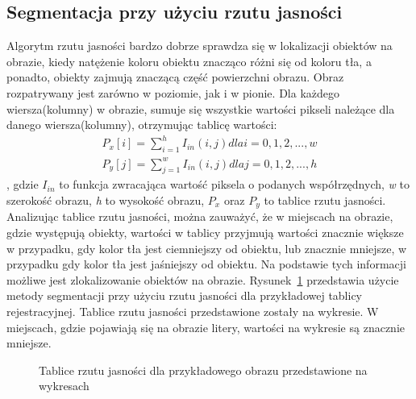 \subsection{Segmentacja przy użyciu rzutu jasności}
Algorytm rzutu jasności bardzo dobrze sprawdza się w lokalizacji obiektów na obrazie, kiedy natężenie koloru obiektu znacząco różni się od koloru tła, a ponadto, obiekty zajmują znaczącą część powierzchni obrazu. Obraz rozpatrywany jest zarówno w poziomie, jak i w pionie. Dla każdego wiersza(kolumny) w obrazie, sumuje się wszystkie wartości pikseli należące dla danego wiersza(kolumny), otrzymując tablicę wartości:
\begin{gather*}
  P_x[i] = \sum\limits_{i=1}^h I_{in}(i, j) dla i = 0,1,2,...,w \\
  P_y[j] = \sum\limits_{j=1}^w I_{in}(i, j) dla j = 0,1,2,...,h
\end{gather*}, gdzie $I_{in}$ to funkcja zwracająca wartość piksela o podanych współrzędnych, \textit{w} to szerokość obrazu, \textit{h} to wysokość obrazu, $P_x$ oraz $P_y$ to tablice rzutu jasności. Analizując tablice rzutu jasności, można zauważyć, że w miejscach na obrazie, gdzie występują obiekty, wartości w tablicy przyjmują wartości znacznie większe w przypadku, gdy kolor tła jest ciemniejszy od obiektu, lub znacznie mniejsze, w przypadku gdy kolor tła jest jaśniejszy od obiektu. Na podstawie tych informacji możliwe jest zlokalizowanie obiektów na obrazie. Rysunek~\ref{fig:rzut_jasnosci} przedstawia użycie metody segmentacji przy użyciu rzutu jasności dla przykładowej tablicy rejestracyjnej. Tablice rzutu jasności przedstawione zostały na wykresie. W miejscach, gdzie pojawiają się na obrazie litery, wartości na wykresie są znacznie mniejsze.

\begin{figure}
  \centering
  \caption{Tablice rzutu jasności dla przykładowego obrazu przedstawione na wykresach}
  \label{fig:rzut_jasnosci}
\end{figure}
